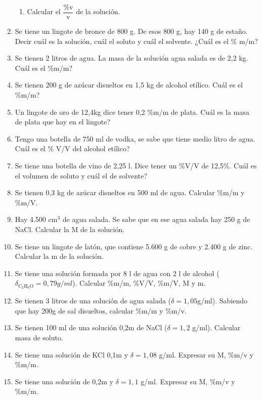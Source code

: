 \begin{enumerate}
\begin{enumerate}
    \item Calcular el $\dfrac{\%\text{v}}{\text{v}}$ de la solución.
\end{enumerate}


\item Se tiene un lingote de bronce de 800 g. De esos 800 g, hay 140 g de estaño. Decir cuál es la solución, cuál el soluto y cuál el solvente. ¿Cuál es el \% m/m? %

\item Se tienen 2 litros de agua. La masa de la solución agua salada es de 2,2 kg. Cuál es el \%m/m? %

\item Se tienen 200 g de azúcar disueltos en 1,5 kg de alcohol etílico. Cuál es el \%m/m? %

\item Un lingote de oro de 12,4kg dice tener 0,2 \%m/m de plata. Cuál es la masa de plata que hay en el lingote?

\item Tengo una botella de 750 ml de vodka, se sabe que tiene medio litro de agua. Cuál es el \% V/V del alcohol etílico?

\item Se tiene una botella de vino de 2,25 l. Dice tener un \%V/V de 12,5\%. Cuál es el volumen de soluto y cuál el de solvente?

\item Se tienen 0,3 kg de azúcar disueltos en 500 ml de agua. Calcular \%m/m y \%m/V.

\item Hay 4.500 cm$^3$ de agua salada. Se sabe que en ese agua salada hay 250 g de NaCl. Calcular la M de la solución. %

\item Se tiene un lingote de latón, que contiene 5.600 g de cobre y 2.400 g de zinc. Calcular la m de la solución. %

\item Se tiene una solución formada por 8 l de agua con 2 l de alcohol ($\delta_{\text{C}_2\text{H}_6\text{O}}=0,79 g/ml$). Calcular \%m/m, \linebreak
\%V/V, \%m/V, M y m.

\item Se tienen 3 litros de una solución de agua salada ($\delta = 1,05$g/ml). Sabiendo que hay 200g de sal disueltos, calcular \%m/m y \%m/v. %

\item Se tienen 100 ml de una solución 0,2m de NaCl ($\delta = 1,2$ g/ml). Calcular masa de soluto. %

\item Se tiene una solución de KCl 0,1m y $\delta=1,08$ g/ml. Expresar su M, \%m/v y \%m/m.

\item Se tiene una solución de  0,2m y $\delta=1,1$ g/ml. Expresar su M, \%m/v y \%m/m.
\end{enumerate}

